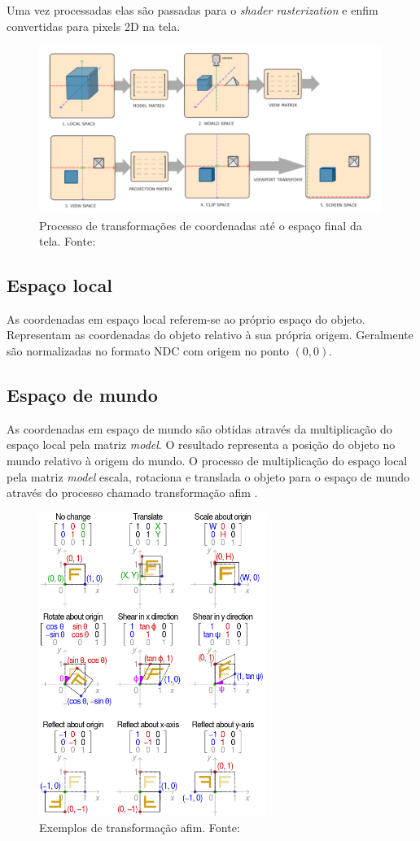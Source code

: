 \documentclass[12pt, 
openright, 
oneside, 
a4paper,    
brazil]{facom-ufu-abntex2}
\begin{document}
Uma vez processadas elas são passadas para o \textit{shader rasterization} e enfim convertidas para pixels 2D na tela.

\begin{figure}[H]
	\centering
	\includegraphics[width=30em]{imagens/coordSpace.png}
	\caption{Processo de transformações de coordenadas até o espaço final da tela. Fonte:~\cite{LearnOpenGL}}
\end{figure}

\subsection{Espaço local}
As coordenadas em espaço local referem-se ao próprio espaço do objeto. Representam as coordenadas do objeto relativo à sua própria origem. Geralmente são normalizadas no formato NDC com origem no ponto $(0,0)$.


\subsection{Espaço de mundo}
As coordenadas em espaço de mundo são obtidas através da multiplicação do espaço local pela matriz \textit{model}. O resultado representa a posição do objeto no mundo relativo à origem do mundo. O processo de multiplicação do espaço local pela matriz \textit{model} escala, rotaciona e translada o objeto para o espaço de mundo através do processo chamado transformação afim \cite{AffineTransformation}.

\begin{figure}[H]
	\centering
	\includegraphics[width=20em]{imagens/affineTransformation.png}
	\caption{Exemplos de transformação afim. Fonte:~\cite{AffineTransformationImg}}
\end{figure}
\end{document}
